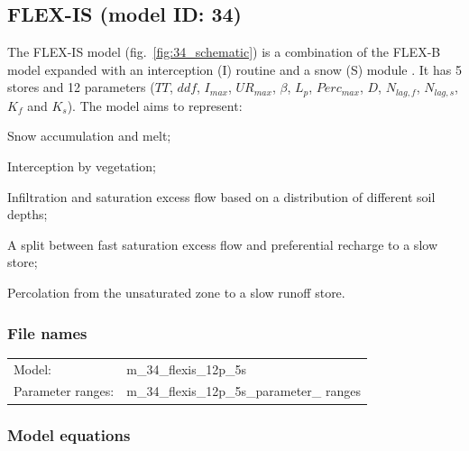 \subsection{FLEX-IS (model ID: 34)}
The FLEX-IS model (fig.~\ref{fig:34_schematic}) is a combination of the FLEX-B model expanded with an interception (I) routine \citep{Fenicia2008} and a snow (S) module \citep{Nijzink2016}. It has 5 stores and 12 parameters ($TT$, $ddf$, $I_{max}$, $UR_{max}$, $\beta$, $L_p$, $Perc_{max}$, $D$, $N_{lag,f}$, $N_{lag,s}$, $K_f$ and $K_s$). The model aims to represent:

\begin{itemizecompact}
\item Snow accumulation and melt;
\item Interception by vegetation;
\item Infiltration and saturation excess flow based on a distribution of different soil depths;
\item A split between fast saturation excess flow and preferential recharge to a slow store;
\item Percolation from the unsaturated zone to a slow runoff store.
\end{itemizecompact}

\subsubsection{File names}
\begin{tabular}{@{}ll}
Model: &m\_34\_flexis\_12p\_5s \\
Parameter ranges: &m\_34\_flexis\_12p\_5s\_parameter\_ ranges \\
\end{tabular}

\subsubsection{Model equations}

